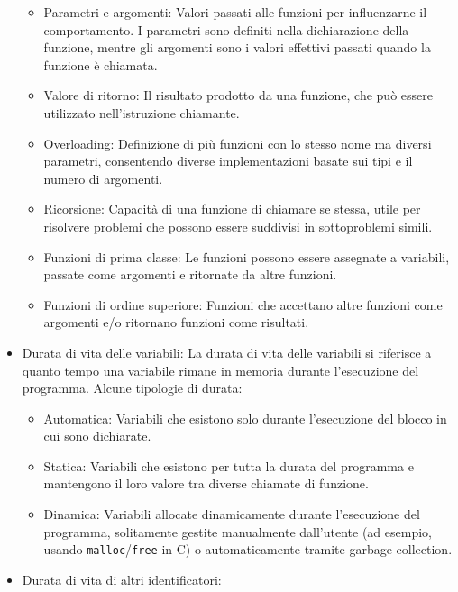 \documentclass[
  letterpaper,
  DIV=11,
  numbers=noendperiod]{scrreprt}
\providecommand{\tightlist}{%
  \setlength{\itemsep}{0pt}\setlength{\parskip}{0pt}}\usepackage{longtable,booktabs,array}
\begin{document}
\begin{itemize}
  \begin{itemize}
  \tightlist
  \item
    Parametri e argomenti: Valori passati alle funzioni per influenzarne
    il comportamento. I parametri sono definiti nella dichiarazione
    della funzione, mentre gli argomenti sono i valori effettivi passati
    quando la funzione è chiamata.
  \item
    Valore di ritorno: Il risultato prodotto da una funzione, che può
    essere utilizzato nell'istruzione chiamante.
  \item
    Overloading: Definizione di più funzioni con lo stesso nome ma
    diversi parametri, consentendo diverse implementazioni basate sui
    tipi e il numero di argomenti.
  \item
    Ricorsione: Capacità di una funzione di chiamare se stessa, utile
    per risolvere problemi che possono essere suddivisi in sottoproblemi
    simili.
  \item
    Funzioni di prima classe: Le funzioni possono essere assegnate a
    variabili, passate come argomenti e ritornate da altre funzioni.
  \item
    Funzioni di ordine superiore: Funzioni che accettano altre funzioni
    come argomenti e/o ritornano funzioni come risultati.
  \end{itemize}
\item
  Durata di vita delle variabili: La durata di vita delle variabili si
  riferisce a quanto tempo una variabile rimane in memoria durante
  l'esecuzione del programma. Alcune tipologie di durata:

  \begin{itemize}
  \tightlist
  \item
    Automatica: Variabili che esistono solo durante l'esecuzione del
    blocco in cui sono dichiarate.
  \item
    Statica: Variabili che esistono per tutta la durata del programma e
    mantengono il loro valore tra diverse chiamate di funzione.
  \item
    Dinamica: Variabili allocate dinamicamente durante l'esecuzione del
    programma, solitamente gestite manualmente dall'utente (ad esempio,
    usando \texttt{malloc}/\texttt{free} in C) o automaticamente tramite
    garbage collection.
  \end{itemize}
\item
  Durata di vita di altri identificatori:


\end{itemize}
\end{document}
